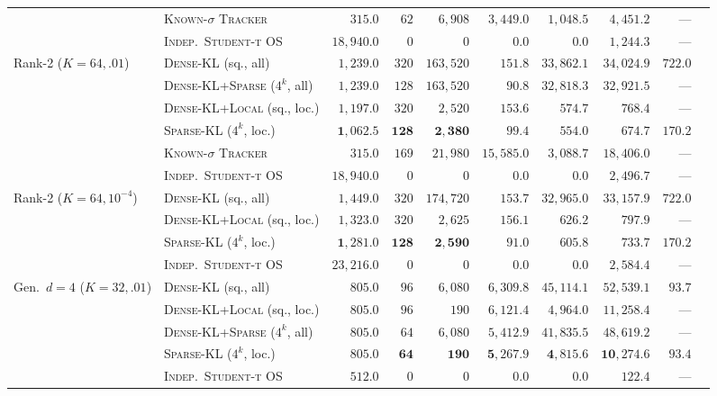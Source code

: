 \documentclass{article}
\theoremstyle{plain}
\theoremstyle{definition}
\begin{document}
\begin{table}[!htbp]
{\begin{tabular}{@{}llrrrrrrrr@{}}
 & \textsc{Known-$\sigma$ Tracker} & $315.0$ & $62$ & $6{,}908$ & $3{,}449.0$ & $1{,}048.5$ & $4{,}451.2$ & --- \\
 & \textsc{Indep.\ Student-t OS} & $18{,}940.0$ & $0$ & $0$ & $0.0$ & $0.0$ & $1{,}244.3$ & --- \\
\midrule
\multirow{6}{*}{Rank-2 ($K=64, .01$)}
 & \textsc{Dense-KL} (sq., all) & $1{,}239.0$ & $320$ & $163{,}520$ & $151.8$ & $33{,}862.1$ & $34{,}024.9$ & $722.0$ \\
 & \textsc{Dense-KL+Sparse} ($4^k$, all) & $1{,}239.0$ & $128$ & $163{,}520$ & $90.8$ & $32{,}818.3$ & $32{,}921.5$ & --- \\
 & \textsc{Dense-KL+Local} (sq., loc.) & $1{,}197.0$ & $320$ & $2{,}520$ & $153.6$ & $574.7$ & $768.4$ & --- \\
 & \textsc{Sparse-KL} ($4^k$, loc.) & $\mathbf{1{,}062.5}$ & $\mathbf{128}$ & $\mathbf{2{,}380}$ & $99.4$ & $\mathbf{554.0}$ & $\mathbf{674.7}$ & $\mathbf{170.2}$ \\
 & \textsc{Known-$\sigma$ Tracker} & $315.0$ & $169$ & $21{,}980$ & $15{,}585.0$ & $3{,}088.7$ & $18{,}406.0$ & --- \\
 & \textsc{Indep.\ Student-t OS} & $18{,}940.0$ & $0$ & $0$ & $0.0$ & $0.0$ & $2{,}496.7$ & --- \\
\midrule
\multirow{4}{*}{Rank-2 ($K=64, 10^{-4}$)}
 & \textsc{Dense-KL} (sq., all) & $1{,}449.0$ & $320$ & $174{,}720$ & $153.7$ & $32{,}965.0$ & $33{,}157.9$ & $722.0$ \\
 & \textsc{Dense-KL+Local} (sq., loc.) & $1{,}323.0$ & $320$ & $2{,}625$ & $156.1$ & $626.2$ & $797.9$ & --- \\
 & \textsc{Sparse-KL} ($4^k$, loc.) & $\mathbf{1{,}281.0}$ & $\mathbf{128}$ & $\mathbf{2{,}590}$ & $\mathbf{91.0}$ & $\mathbf{605.8}$ & $\mathbf{733.7}$ & $\mathbf{170.2}$ \\
 & \textsc{Indep.\ Student-t OS} & $23{,}216.0$ & $0$ & $0$ & $0.0$ & $0.0$ & $2{,}584.4$ & --- \\
\midrule
\multirow{5}{*}{Gen.\ $d=4$ ($K=32, .01$)}
 & \textsc{Dense-KL} (sq., all) & $805.0$ & $96$ & $6{,}080$ & $6{,}309.8$ & $45{,}114.1$ & $52{,}539.1$ & $93.7$ \\
 & \textsc{Dense-KL+Local} (sq., loc.) & $805.0$ & $96$ & $190$ & $6{,}121.4$ & $4{,}964.0$ & $11{,}258.4$ & --- \\
 & \textsc{Dense-KL+Sparse} ($4^k$, all) & $805.0$ & $64$ & $6{,}080$ & $5{,}412.9$ & $41{,}835.5$ & $48{,}619.2$ & --- \\
 & \textsc{Sparse-KL} ($4^k$, loc.) & $805.0$ & $\mathbf{64}$ & $\mathbf{190}$ & $\mathbf{5{,}267.9}$ & $\mathbf{4{,}815.6}$ & $\mathbf{10{,}274.6}$ & $\mathbf{93.4}$ \\
 & \textsc{Indep.\ Student-t OS} & $\mathbf{512.0}$ & $0$ & $0$ & $0.0$ & $0.0$ & $122.4$ & --- \\
\bottomrule
\end{tabular}%
}
\end{table}
\end{document}
